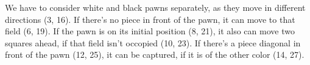 We have to consider white and black pawns separately, as they move in different directions (3, 16).
If there's no piece in front of the pawn, it can move to that field (6, 19).
If the pawn is on its initial position (8, 21), it also can move two squares ahead, if that field
isn't occopied (10, 23).
If there's a piece diagonal in front of the pawn (12, 25), it can be captured, if it is of the
other color (14, 27).
